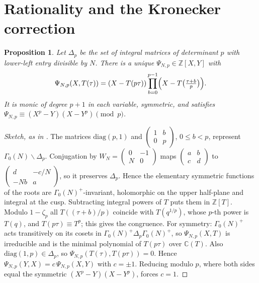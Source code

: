 \documentclass[11pt,a4paper]{article}
\numberwithin{equation}{section}
\newtheorem{proposition}[theorem]{Proposition}
\theoremstyle{definition}
\theoremstyle{remark}
\newcommand{\Z}{\mathbb Z}
\begin{document}
\section{Rationality and the Kronecker correction}\label{sec:kron}

\begin{proposition}\label{prop:Psi}
Let $\Delta_p$ be the set of integral matrices of determinant $p$ with lower-left entry divisible by
$N$. There is a unique $\Psi_{N,p}\in\Z[X,Y]$ with
\[
\Psi_{N,p}(X,T(\tau))=(X-T(p\tau))\prod_{b=0}^{p-1}\Bigl(X-T\bigl(\tfrac{\tau+b}{p}\bigr)\Bigr).
\]
It is monic of degree $p+1$ in each variable, symmetric, and satisfies
$\Psi_{N,p}\equiv(X^p-Y)(X-Y^p)\pmod p$.
\end{proposition}
\begin{proof}[Sketch, as in {\citealp[Prop.~2.1]{Jordan26}}]
The matrices $\mathrm{diag}(p,1)$ and $\begin{pmatrix}1&b\\0&p\end{pmatrix}$, $0\le b<p$, represent
$\Gamma_0(N)\backslash\Delta_p$. Conjugation by $W_N=\begin{pmatrix}0&-1\\N&0\end{pmatrix}$ maps
$\begin{pmatrix}a&b\\c&d\end{pmatrix}$ to $\begin{pmatrix}d&-c/N\\-Nb&a\end{pmatrix}$, so it preserves
$\Delta_p$. Hence the elementary symmetric functions of the roots are $\Gamma_0(N)^+$-invariant,
holomorphic on the upper half-plane and integral at the cusp. Subtracting integral powers of $T$
puts them in $\Z[T]$. Modulo $1-\zeta_p$ all $T((\tau+b)/p)$ coincide with $T(q^{1/p})$, whose $p$-th power is $T(q)$, and
$T(p\tau)\equiv T^p$; this gives the congruence. For symmetry: $\Gamma_0(N)^+$ acts transitively on its cosets in $\Gamma_0(N)^+\Delta_p\Gamma_0(N)^+$, so
$\Psi_{N,p}(X,T)$ is irreducible and is the minimal polynomial of $T(p\tau)$ over $\mathbb C(T)$. Also $\mathrm{diag}(1,p)\in\Delta_p$, so $\Psi_{N,p}(T(\tau),T(p\tau))=0$.
Hence $\Psi_{N,p}(Y,X)=c\,\Psi_{N,p}(X,Y)$ with $c=\pm1$. Reducing modulo $p$, where both sides
equal the symmetric $(X^p-Y)(X-Y^p)$, forces $c=1$.
\end{proof}
\end{document}

